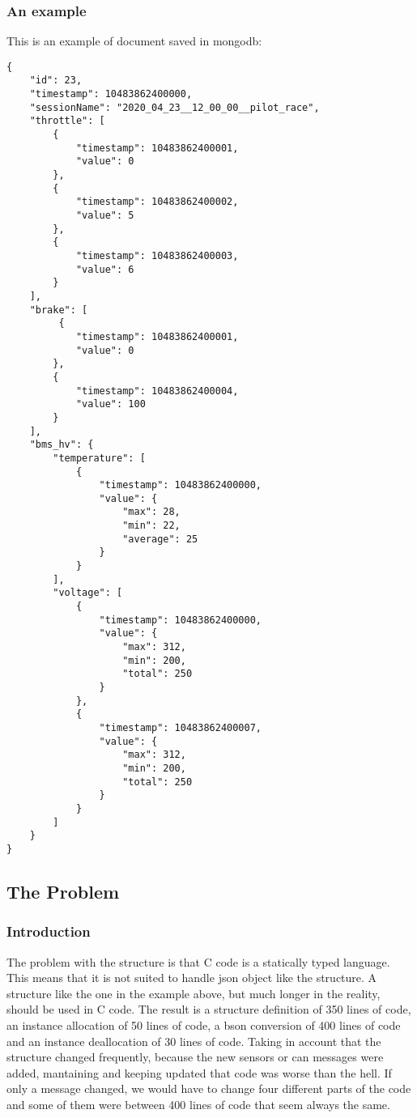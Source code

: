 \subsubsection{An example}
This is an example of document saved in mongodb:
\begin{verbatim}
{
    "id": 23,
    "timestamp": 10483862400000,
    "sessionName": "2020_04_23__12_00_00__pilot_race",
    "throttle": [
        {
            "timestamp": 10483862400001,
            "value": 0
        },
        {
            "timestamp": 10483862400002,
            "value": 5
        },
        {
            "timestamp": 10483862400003,
            "value": 6
        }
    ],
    "brake": [
         {
            "timestamp": 10483862400001,
            "value": 0
        },
        {
            "timestamp": 10483862400004,
            "value": 100
        }
    ],
    "bms_hv": {
        "temperature": [
            {
                "timestamp": 10483862400000,
                "value": {
                    "max": 28,
                    "min": 22,
                    "average": 25
                }
            }
        ],
        "voltage": [
            {
                "timestamp": 10483862400000,
                "value": {
                    "max": 312,
                    "min": 200,
                    "total": 250
                }
            },
            {
                "timestamp": 10483862400007,
                "value": {
                    "max": 312,
                    "min": 200,
                    "total": 250
                }
            }
        ]
    }
}
\end{verbatim}

\subsection{The Problem}

\subsubsection{Introduction}

The problem with the structure is that C code is a statically typed language. This means that it is not suited to handle json object like the
structure. A structure like the one in the example above, but much longer in the reality, should be used in C code. The result is a structure 
definition of 350 lines of code, an instance allocation of 50 lines of code, a bson conversion of 400 lines of code and an instance deallocation
of 30 lines of code. Taking in account that the structure changed frequently, because the new sensors or can messages were added, mantaining and
keeping updated that code was worse than the hell. If only a message changed, we would have to change four different parts of the code and
some of them were between 400 lines of code that seem always the same.


